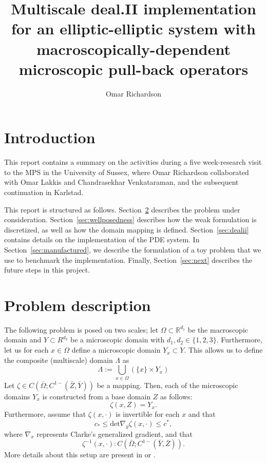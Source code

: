 \documentclass{article}
\title{Multiscale deal.II implementation for an elliptic-elliptic system with macroscopically-dependent microscopic pull-back operators}
\author{Omar Richardson}
\newcommand{\R}{\mathbb{ R}}
\begin{document}
\maketitle

\section{Introduction}
This report contains a summary on the activities during a five week-research visit to the MPS in the University of Sussex, where Omar Richardson collaborated with Omar Lakkis and Chandrasekhar Venkataraman, and the subsequent continuation in Karlstad.

This report is structured as follows. Section~\ref{sec:problem} describes the problem under consideration.
Section~\ref{sec:wellposedness} describes how the weak formulation is discretized, as well as how the domain mapping is defined.
Section~\ref{sec:dealii} contains details on the implementation of the PDE system.
In Section~\ref{sec:manufactured}, we describe the formulation of a toy problem that we use to benchmark the implementation.
Finally, Section~\ref{sec:next} describes the future steps in this project.

\section{Problem description}
\label{sec:problem}
The following problem is posed on two scales; let $\Omega \subset \R^{d_1}$ be the macroscopic domain and $Y \subset R^{d_2}$ be a microscopic domain with $d_1,d_2 \in \{1,2,3\}$. Furthermore, let us for each $x \in \Omega$ define a microscopic domain $Y_x \subset Y$.
This allows us to define the composite (multiscale) domain $\Lambda$ as
\begin{equation*}
    \Lambda := \bigcup_{x\in\Omega} \left(  \{ x \} \times Y_x\right)
\end{equation*}
Let $\zeta \in C(\bar{\Omega};C^{1-}(\bar{Z},\bar{Y}))$ be a mapping. Then, each of the microscopic domains $Y_x$ is constructed from a base domain $Z$ as follows:
\begin{equation}
    \zeta(x,Z) = Y_x.
\end{equation}
Furthermore, assume that $\zeta(x,\cdot)$ is invertible for each $x$ and that
\begin{equation}
    c_*  \leq \mathrm{det}\nabla_y \zeta(x,\cdot) \leq c^*,
\end{equation}
where $\nabla_x$ represents Clarke's generalized gradient, and that
\begin{equation}
    \zeta^{-1}(x,\cdot):  C(\bar{\Omega};C^{1-}(\bar{Y},\bar{Z})).
\end{equation}
More details about this setup are present in \cite{sebamPhD} or \cite{lakkis13}.
\end{document}
